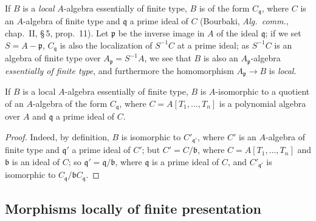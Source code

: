 \begin{env}[1.3.10]
\label{IV.1.3.10}
If $B$ is a \emph{local} $A$-algebra essentially of finite type, $B$ is of the
form $C_{\mathfrak{q}}$, where $C$ is an $A$-algebra of finite type and $\mathfrak{q}$ a prime ideal of $C$ (Bourbaki,
\emph{Alg.\ comm.}, chap.~II, \S\,5, prop.~11). Let $\mathfrak{p}$ be the inverse image in $A$ of the ideal $\mathfrak{q}$; if we set
$S=A-\mathfrak{p}$, $C_{\mathfrak{q}}$ is also the localization of $S^{-1}C$ at a prime ideal; as $S^{-1}C$
is an algebra of finite type over $A_{\mathfrak{p}}=S^{-1}A$, we see that $B$ is also an $A_{\mathfrak{p}}$-algebra \emph{essentially
of finite type}, and furthermore the homomorphism $A_{\mathfrak{p}}\to B$ is \emph{local}.
\end{env}

\begin{proposition}[1.3.11]
\label{IV.1.3.11}
If $B$ is a local $A$-algebra essentially of finite type, $B$ is
$A$-isomorphic to a quotient of an $A$-algebra of the form $C_{\mathfrak{q}}$, where
$C=A[T_1,\ldots,T_n]$ is a polynomial algebra over $A$ and $\mathfrak{q}$ a prime ideal of $C$.
\end{proposition}

\begin{proof}
Indeed, by definition, $B$ is isomorphic to $C'_{\mathfrak{q}'}$, where $C'$ is an $A$-algebra of finite type
and $\mathfrak{q}'$ a prime ideal of $C'$; but $C'=C/\mathfrak{b}$, where $C=A[T_1,\ldots,T_n]$ and $\mathfrak{b}$ is an
ideal of $C$; so $\mathfrak{q}'=\mathfrak{q}/\mathfrak{b}$, where $\mathfrak{q}$ is a prime ideal of $C$, and $C'_{\mathfrak{q}'}$ is isomorphic to $C_{\mathfrak{q}}/\mathfrak{b} C_{\mathfrak{q}}$.
\end{proof}

\subsection{Morphisms locally of finite presentation}
\label{subsection:IV.1.4}

